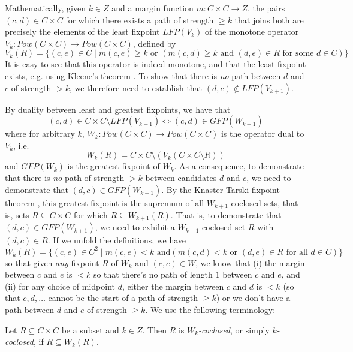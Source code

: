 Mathematically, given $k \in Z$ and a margin function $m: C \times C
\to Z$, the pairs $(c, d) \in C \times C$ for which there exists a
path of strength $\geq k$ that joins both are precisely the elements
of the least fixpoint $LFP(V_k)$ of the monotone operator $V_k:
Pow(C \times C) \to Pow(C \times C)$, defined by
\[ V_k(R) = \lbrace (c, e) \in C \mid m(c, e) \geq k \mbox{ or }
(m(c, d) \geq k \mbox{ and } (d, e) \in R \mbox{ for some } d \in C)
\rbrace \]
It is easy to see that this operator is indeed monotone, and that
the least fixpoint exists, e.g. using Kleene's theorem
\cite{Stoltenberg-Hansen:1994:MTD}.  To show that there is \emph{no}
path between $d$ and $c$ of strength $> k$, we therefore need to
establish that
$(d, c) \notin LFP(V_{k+1})$.

By duality between least and greatest fixpoints, we have that \[
(c, d) \in C \times C
\setminus LFP(V_{k+1}) \iff (c,d) \in GFP(W_{k+1}) \]
where for arbitrary $k$, $W_k: Pow(C \times C) \to Pow(C \times C)$ is the operator dual
to $V_k$, i.e.
\[ W_k(R) = C \times C \setminus (V_k (C\times C \setminus R)) \]
and $GFP(W_k)$ is the greatest fixpoint of $W_k$.
As a consequence, to demonstrate that there is \emph{no} path of
strength $> k$ between candidates $d$ and $c$, we need to
demonstrate that $(d, c) \in GFP(W_{k+1})$. By the Knaster-Tarski fixpoint
theorem \cite{Tarski:1955:LTF}, this greatest fixpoint is the supremum of all
$W_{k+1}$-coclosed sets, that is, sets $R \subseteq C \times C$ for which
$R \subseteq W_{k+1}(R)$.
That is, to demonstrate that $(d, c) \in GFP(W_{k+1})$, we need
to exhibit a $W_{k+1}$-coclosed set $R$ with $(d, c) \in R$.
If we unfold the definitions, we have
\[ W_k(R) = \lbrace (c, e) \in C^2 \mid m(c, e) < k \mbox{ and
} (m(c, d) < k \mbox{ or } (d,e) \in R \mbox{ for all } d \in C)
\rbrace \]
so that given \emph{any} fixpoint $R$ of $W_k$ and $(c, e) \in W$, we
know that (i) the margin between $c$ and $e$ is $< k$ so that
there's no path of length $1$ between $c$ and $e$, and (ii) for any
choice of midpoint $d$, either the margin between $c$ and $d$ is $<
k$ (so that $c, d, \dots$ cannot be the start of a path of strength
$\geq k$) or we don't have a path between $d$ and $e$ of strength
$\geq k$. We use the following terminology:

Let $R \subseteq C \times C$ be a subset and $k \in
Z$. Then $R$ is \emph{$W_k$-coclosed}, or simply
\emph{$k$-coclosed}, if $R \subseteq W_k(R)$.


